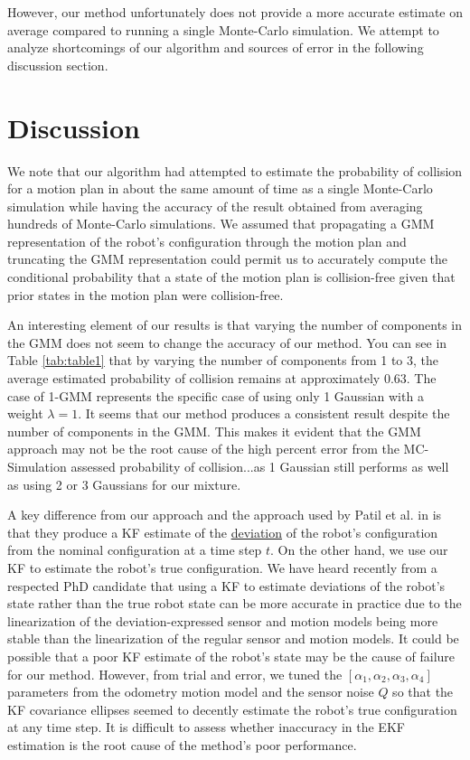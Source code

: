 \documentclass[journal]{IEEEtran}
\begin{document}
However, our method unfortunately does not provide a more accurate estimate on average compared to running a single Monte-Carlo simulation. We attempt to analyze shortcomings of our algorithm and sources of error in the following discussion section.

\section{Discussion}
We note that our algorithm had attempted to estimate the probability of collision for a motion plan in about the same amount of time as a single Monte-Carlo simulation while having the accuracy of the result obtained from averaging hundreds of Monte-Carlo simulations. We assumed that propagating a GMM representation of the robot's configuration through the motion plan and truncating the GMM representation could permit us to accurately compute the conditional probability that a state of the motion plan is collision-free given that prior states in the motion plan were collision-free.

An interesting element of our results is that varying the number of components in the GMM does not seem to change the accuracy of our method. You can see in Table \ref{tab:table1} that by varying the number of components from 1 to 3, the average estimated probability of collision remains at approximately 0.63. The case of 1-GMM represents the specific case of using only 1 Gaussian with a weight $\lambda=1$. It seems that our method produces a consistent result despite the number of components in the GMM. This makes it evident that the GMM approach may not be the root cause of the high percent error from the MC-Simulation assessed probability of collision...as 1 Gaussian still performs as well as using 2 or 3 Gaussians for our mixture.

A key difference from our approach and the approach used by Patil et al. in \cite{IEEEhowto:patil} is that they produce a KF estimate of the \underline{deviation} of the robot's configuration from the nominal configuration at a time step $t$. On the other hand, we use our KF to estimate the robot's true configuration. We have heard recently from a respected PhD candidate that using a KF to estimate deviations of the robot's state rather than the true robot state can be more accurate in practice due to the linearization of the deviation-expressed sensor and motion models being more stable than the linearization of the regular sensor and motion models.
It could be possible that a poor KF estimate of the robot's state may be the cause of failure for our method. However, from trial and error, we tuned the $[\alpha_1,\alpha_2,\alpha_3,\alpha_4]$ parameters from the odometry motion model and the sensor noise $Q$ so that the KF covariance ellipses seemed to decently estimate the robot's true configuration at any time step. It is difficult to assess whether inaccuracy in the EKF estimation is the root cause of the method's poor performance.
\end{document}
